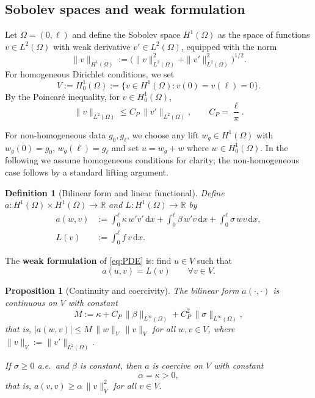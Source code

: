 \documentclass[11pt]{article}
\newcommand{\R}{\mathbb{R}}
\newcommand{\dom}{\Omega}
\newcommand{\dd}{\,\mathrm{d}}
\newtheorem{definition}{Definition}[section]
\newtheorem{proposition}[theorem]{Proposition}
\theoremstyle{remark}
\begin{document}
\subsection{Sobolev spaces and weak formulation}

Let $\dom = (0,\ell)$ and define the Sobolev space $H^1(\dom)$ as the space of functions $v \in L^2(\dom)$ with weak derivative $v' \in L^2(\dom)$, equipped with the norm
\begin{equation}
\|v\|_{H^1(\dom)} := \bigl(\|v\|_{L^2(\dom)}^2 + \|v'\|_{L^2(\dom)}^2\bigr)^{1/2}.
\end{equation}
For homogeneous Dirichlet conditions, we set
\begin{equation}
V := H_0^1(\dom) := \bigl\{v \in H^1(\dom) : v(0) = v(\ell) = 0\bigr\}.
\end{equation}
By the Poincar\'e inequality, for $v \in H_0^1(\dom)$,
\begin{equation}\label{eq:poincare}
\|v\|_{L^2(\dom)} \leq C_P\,\|v'\|_{L^2(\dom)}, \qquad C_P = \frac{\ell}{\pi}.
\end{equation}

For non-homogeneous data $g_0, g_\ell$, we choose any lift $w_g \in H^1(\dom)$ with $w_g(0)=g_0$, $w_g(\ell)=g_\ell$ and set $u = w_g + w$ where $w \in H_0^1(\dom)$. In the following we assume homogeneous conditions for clarity; the non-homogeneous case follows by a standard lifting argument.

\begin{definition}[Bilinear form and linear functional]
\label{def:bilinear}
Define $a : H^1(\dom) \times H^1(\dom) \to \R$ and $L : H^1(\dom) \to \R$ by
\begin{align}
a(w,v) &:= \int_0^\ell \kappa\,w'v'\dd x + \int_0^\ell \beta\,w'v\dd x + \int_0^\ell \sigma\,wv\dd x,\label{eq:bilinear}\\
L(v) &:= \int_0^\ell f\,v\dd x.\label{eq:linear}
\end{align}
\end{definition}

The \textbf{weak formulation} of \eqref{eq:PDE} is: find $u \in V$ such that
\begin{equation}\label{eq:weak}
a(u,v) = L(v) \qquad \forall v \in V.
\end{equation}

\begin{proposition}[Continuity and coercivity]
\label{prop:continuity_coercivity}
The bilinear form $a(\cdot,\cdot)$ is continuous on $V$ with constant
\begin{equation}\label{eq:M}
M := \kappa + C_P\,\|\beta\|_{L^\infty(\dom)} + C_P^2\,\|\sigma\|_{L^\infty(\dom)},
\end{equation}
that is, $|a(w,v)| \leq M\,\|w\|_V\,\|v\|_V$ for all $w,v \in V$, where $\|v\|_V := \|v'\|_{L^2(\dom)}$.

If $\sigma \geq 0$ a.e.\ and $\beta$ is constant, then $a$ is coercive on $V$ with constant
\begin{equation}\label{eq:alpha}
\alpha = \kappa > 0,
\end{equation}
that is, $a(v,v) \geq \alpha\,\|v\|_V^2$ for all $v \in V$.
\end{proposition}
\end{document}
